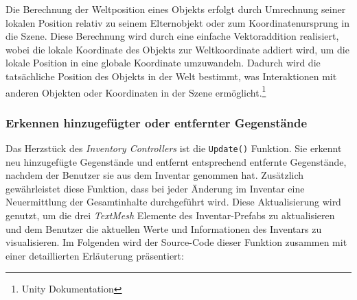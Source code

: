 Die Berechnung der Weltposition eines Objekts erfolgt durch Umrechnung seiner lokalen Position relativ zu seinem Elternobjekt
oder zum Koordinatenursprung in die Szene. Diese Berechnung wird durch eine einfache Vektoraddition realisiert, wobei die
lokale Koordinate des Objekts zur Weltkoordinate addiert wird, um die lokale Position in eine globale Koordinate umzuwandeln.
Dadurch wird die tatsächliche Position des Objekts in der Welt bestimmt, was Interaktionen mit anderen Objekten oder
Koordinaten in der Szene ermöglicht.\footnote{Unity Dokumentation\cite{Lokal- und Weltposition}}

\subsubsection{Erkennen hinzugefügter oder entfernter Gegenstände}
Das Herzstück des \textit{Inventory Controllers} ist die \texttt{Update()} Funktion. Sie erkennt neu hinzugefügte Gegenstände
und entfernt entsprechend entfernte Gegenstände, nachdem der Benutzer sie aus dem Inventar genommen hat. Zusätzlich
gewährleistet diese Funktion, dass bei jeder Änderung im Inventar eine Neuermittlung der Gesamtinhalte durchgeführt wird.
Diese Aktualisierung wird genutzt, um die drei \textit{TextMesh} Elemente des Inventar-Prefabs zu aktualisieren und dem
Benutzer die aktuellen Werte und Informationen des Inventars zu visualisieren. Im Folgenden wird der Source-Code dieser
Funktion zusammen mit einer detaillierten Erläuterung präsentiert:
